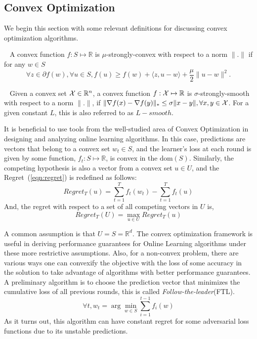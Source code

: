 \subsection{Convex Optimization}

We begin this section with some relevant definitions for discussing convex optimization algorithms.

\begin{definition}
	~\label{def:strconvex}
	A convex function $f: S \mapsto \mathbb{R}$ is $\mu$-strongly-convex with respect to a norm $\|.
		\|$ if for any $w \in S$
	\begin{equation}
		\forall z \in \partial f(w), \forall u \in S, f(u) \geq f(w) + \langle z, u - w\rangle + \frac{\mu}{2}\| u - w \|^2.
	\end{equation}
\end{definition}

\begin{definition}~\label{def:strsmooth}
	Given a convex set $\mathcal{X} \in \mathbb{R}^n$, a convex function $f: \mathcal{X} \mapsto \mathbb{R}$ is
	$\sigma$-strongly-smooth with respect to a norm $\|.
		\|$, if $\|\nabla f(x) - \nabla f(y) \|_{\ast} \leq \sigma \|x - y \|, \forall x, y \in \mathcal{X}$.
	For a given constant $L$, this is also referred to as $L-smooth$.
\end{definition}


It is beneficial to use tools from the well-studied area of Convex Optimization in designing and
analyzing online learning algorithms.
In this case, predictions are vectors that belong to a convex set $w_t \in S$, and the learner's
loss at each round is given by some function, $f_t: S \mapsto \mathbb{R}$, is convex in the
$\text{dom}(S)$.
Similarly, the competing hypothesis is also a vector from a convex set $u \in U$, and the
Regret~(\ref{eqn:regret}) is redefined as follows:
\begin{equation}
	Regret_T(u) = \sum_{t=1}^T
	f_t(w_t) - \sum_{t=1}^T f_t(u)
\end{equation} And, the regret with respect to a set of all
competing vectors in $U$ is,
\begin{equation}
	Regret_T(U) = \max_{u \in U} Regret_T(u)
\end{equation}

A common assumption is that $U=S=\mathbb{R}^d$.
The convex optimization framework is useful in deriving performance guarantees for Online Learning
algorithms under these more restrictive assumptions.
Also, for a non-convex problem, there are various ways one can convexify the objective with the
loss of some accuracy in the solution to take advantage of algorithms with better performance
guarantees.
A preliminary algorithm is to choose the prediction vector that minimizes the cumulative loss of
all previous rounds, this is called \textit{Follow-the-leader}(FTL).
$$ \forall t, w_t = \arg \min_{w \in S} \sum_{i=1}^{t-1} f_i(w)$$
As it turns out, this algorithm can have constant regret for some
adversarial loss functions due to its unstable predictions.

